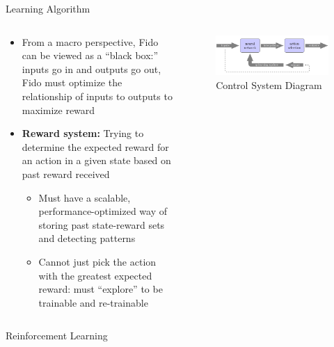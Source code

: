 \documentclass[final]{beamer}
\newlength{\onecolwid}
\newlength{\twocolwid}
\begin{document}
\begin{frame}[t]
\begin{columns}[t]
\begin{column}{\twocolwid}
	\begin{block}{Learning Algorithm}
		\begin{columns}[t,totalwidth=\twocolwid]
			\begin{column}{\onecolwid}
				\begin{itemize}
					\item From a macro perspective, Fido can be viewed as a ``black box:'' inputs go in and outputs go out, Fido must optimize the relationship of inputs to outputs to maximize reward
					\item  \textbf{Reward system:} Trying to determine the expected reward for an action in a given state based on past reward received
					\begin{itemize}
						\item Must have a scalable, performance-optimized way of storing past state-reward sets and detecting patterns
						\item Cannot just pick the action with the greatest expected reward: must ``explore'' to be trainable and re-trainable
					\end{itemize}
				\end{itemize}
			\end{column}
			\begin{column}{\onecolwid}
				\begin{figure}
					\centering
					\includegraphics[width=\linewidth]{Figures/diagramRendered.png}
					\caption{Control System Diagram}
				\end{figure}
			\end{column}
		\end{columns}
	\end{block}

\begin{columns}[t,totalwidth=\twocolwid]

\begin{column}{\onecolwid}\begin{block}{Reinforcement Learning}


\end{block}
\end{column}
\end{columns}
\end{column}
\end{columns}
\end{frame}
\end{document}
